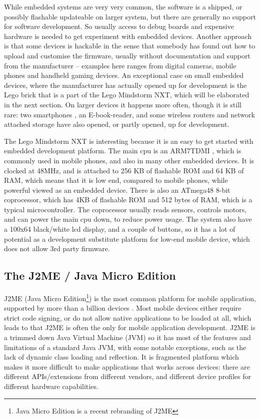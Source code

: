 \documentclass[11pt]{report}
\begin{document}
While embedded systems are very very common, the software is a shipped, or possibly flashable updateable on larger system, but there are generally no support for software development.
So usually access to debug boards and expensive hardware is needed to get experiment with embedded devices.
Another approach is that some devices is hackable in the sense that somebody has found out how to upload and customise the firmware, usually without documentation and support from the manufacturer -- examples here ranges from digital cameras, mobile phones and handheld gaming devices.
An exceptional case on small embedded devices, where the manufacturer has actually opened up for development is the Lego brick that is a part of the Lego Mindstorm NXT, which will be elaborated in the next section.
On larger devices it happens more often, though it is still rare: two smartphones \cite{openmoko, htc-android}, an E-book-reader, and some wireless routers and network attached storage \cite{wrtg, nslu, buffalo} have also opened, or partly opened, up for development.

The Lego Mindstorm NXT is interesting because it is an easy to get started with embedded development platform. 
The main cpu is an ARM7TDMI \cite{arm7tdmi}, which is commonly used in mobile phones, and also in many other embedded devices. 
It is clocked at 48MHz, and is attached to 256 KB of flashable ROM and 64 KB of RAM, which means that it is low end, compared to mobile phones, while powerful viewed as an embedded device.
There is also an ATmega48 \cite{atmega48} 8-bit coprocessor, which has 4KB of flashable ROM and 512 bytes of RAM, which is a typical microcontroller. 
The coprocessor usually reads sensors, controls motors, and can power the main cpu down, to reduce power usage.
The system also have a 100x64 black/white lcd display, and a couple of buttons, so it has a lot of potential as a development substitute platform for low-end mobile device, which does not allow 3rd party firmware.

\subsection{The J2ME / Java Micro Edition}
J2ME (Java Micro Edition\footnote{Java Micro Edition is a recent rebranding of J2ME}) is the most common platform for mobile application, supported by more than a billion devices \cite{sun-j2me}. 
Most mobile devices either require strict code signing, or do not allow native applications to be loaded at all, which leads to that J2ME is often the only for mobile application development.
J2ME is a trimmed down Java Virtual Machine (JVM) so it has most of the features and limitations of a standard Java JVM, with some notable exceptions, such as the lack of dynamic class loading and reflection. It is fragmented platform which makes it more difficult to make applications that works across devices: there are different APIs/extensions from different vendors, and different device profiles for different hardware capabilities.
\end{document}
